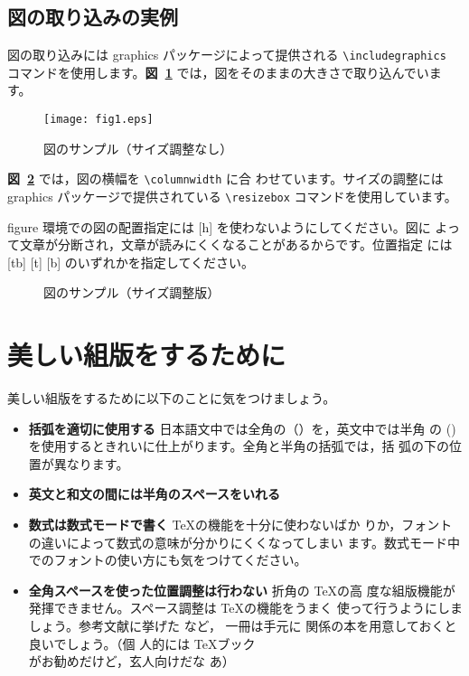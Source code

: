 \documentclass[a4j,10pt,twocolumn]{jarticle}
\begin{document}
\subsection{図の取り込みの実例}

図の取り込みには graphics パッケージによって提供される 
\verb+\includegraphics+ コマンドを使用します。\textbf{図~\ref{fig-sample1}}
では，図をそのままの大きさで取り込んでいます。

\begin{figure}[tb]
 \begin{center}
  \texttt{[image: fig1.eps]}
  \caption{図のサンプル（サイズ調整なし）}
  \label{fig-sample1}
\end{center}
\end{figure}

\textbf{図~\ref{fig-sample2}} では，図の横幅を \verb+\columnwidth+ に合
わせています。サイズの調整には graphics パッケージで提供されている 
\verb+\resizebox+ コマンドを使用しています。

figure 環境での図の配置指定には [h] を使わないようにしてください。図に
よって文章が分断され，文章が読みにくくなることがあるからです。位置指定
には [tb] [t] [b] のいずれかを指定してください。

\begin{figure}[tb]
 \begin{center}
  \caption{図のサンプル（サイズ調整版）}
  \label{fig-sample2}
\end{center}
\end{figure}


\section{美しい組版をするために}

美しい組版をするために以下のことに気をつけましょう。

\begin{itemize}
 \item \textbf{括弧を適切に使用する} 日本語文中では全角の（）を，英文中では半角
       の () を使用するときれいに仕上がります。全角と半角の括弧では，括
       弧の下の位置が異なります。
 \item \textbf{英文と和文の間には半角のスペースをいれる}
 \item \textbf{数式は数式モードで書く} \TeX の機能を十分に使わないばか
       りか，フォントの違いによって数式の意味が分かりにくくなってしまい
       ます。数式モード中でのフォントの使い方にも気をつけてください。
 \item \textbf{全角スペースを使った位置調整は行わない} 折角の \TeX の高
       度な組版機能が発揮できません。スペース調整は \TeX の機能をうまく
       使って行うようにしましょう。参考文献に挙げた \cite{texdoc} など，
       一冊は手元に \LaTeXe 関係の本を用意しておくと良いでしょう。（個
       人的には \TeX ブック \cite{texbook} がお勧めだけど，玄人向けだな
       あ）
\end{itemize}
\end{document}
